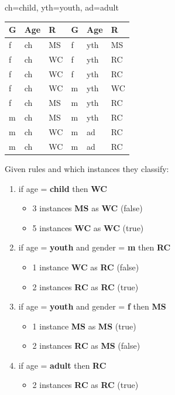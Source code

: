 \begin{breakbox}
ch=child, yth=youth, ad=adult

\begin{tabular}{l|l|l||l|l|l}
\textbf{G} & \textbf{Age} & \textbf{R} & \textbf{G} & \textbf{Age} & \textbf{R} \\
\hline
f & ch & MS   & f & yth & MS   \\
f & ch & WC   & f & yth & RC   \\
f & ch & WC   & f & yth & RC   \\
f & ch & WC   & m & yth & WC   \\
f & ch & MS   & m & yth & RC   \\
m & ch & MS   & m & yth & RC   \\
m & ch & WC   & m & ad & RC   \\
m & ch & WC   & m & ad & RC  
\end{tabular}

Given rules and which instances they classify:

\begin{enumerate}
	\item if age = \textbf{child} then \textbf{WC}
		\begin{itemize}
			\item 3 instances \textbf{MS} as \textbf{WC} (false)
			\item 5 instances \textbf{WC} as \textbf{WC} (true)
		\end{itemize}
	\item if age = \textbf{youth} and gender = \textbf{m} then \textbf{RC}
		\begin{itemize}
			\item 1 instance \textbf{WC} as \textbf{RC} (false)
			\item 2 instances \textbf{RC} as \textbf{RC} (true)
		\end{itemize}
	\item if age = \textbf{youth} and gender = \textbf{f} then \textbf{MS}
		\begin{itemize}
			\item 1 instance \textbf{MS} as \textbf{MS} (true)
			\item 2 instances \textbf{RC} as \textbf{MS} (false)
		\end{itemize}
	\item if age = \textbf{adult} then \textbf{RC}
		\begin{itemize}
			\item 2 instances \textbf{RC} as \textbf{RC} (true)
		\end{itemize}
\end{enumerate}


\end{breakbox}
